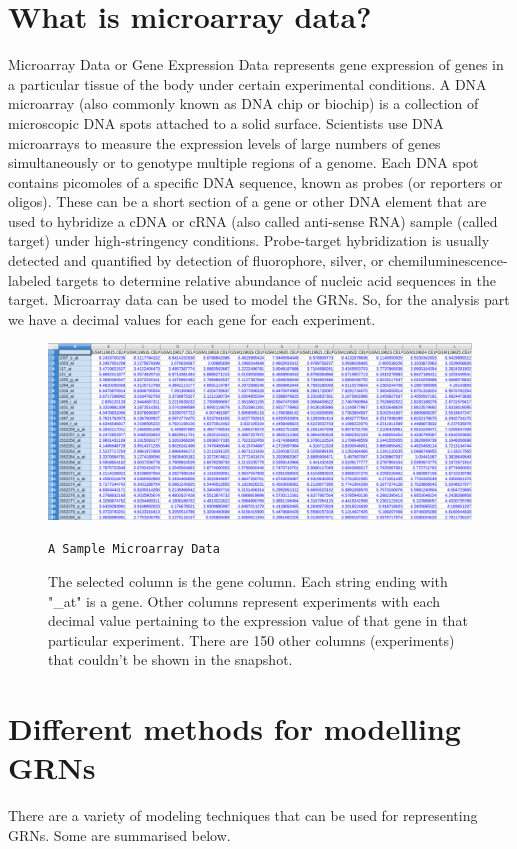 \documentclass[oneside, a4paper, 11pt]{book}
\begin{document}
\section{What is microarray data?}
Microarray Data or Gene Expression Data represents gene expression of genes in a particular tissue of the body under certain experimental conditions. A DNA microarray (also commonly known as DNA chip or biochip) is a collection of microscopic DNA spots attached to a solid surface. Scientists use DNA microarrays to measure the expression levels of large numbers of genes simultaneously or to genotype multiple regions of a genome. Each DNA spot contains picomoles of a specific DNA sequence, known as probes (or reporters or oligos). These can be a short section of a gene or other DNA element that are used to hybridize a cDNA or cRNA (also called anti-sense RNA) sample (called target) under high-stringency conditions. Probe-target hybridization is usually detected and quantified by detection of fluorophore, silver, or chemiluminescence-labeled targets to determine relative abundance of nucleic acid sequences in the target. Microarray data can be used to model the GRNs. So, for the analysis part we have a decimal values for each gene for each experiment.

\begin{figure}[h]
    \centering
    \includegraphics[width=\textwidth]{microarray.png}
    \caption {\texttt{A Sample Microarray Data}}
    \captionsetup{singlelinecheck=off,font=footnotesize, width=0.8\textwidth}
    \caption*{The selected column is the gene column. Each string ending with "\_at" is a gene. Other columns represent experiments with each decimal value pertaining to the expression value of that gene in that particular experiment. There are 150 other columns (experiments) that couldn't be shown in the snapshot.}
\end{figure}

\section{Different methods for modelling GRNs}
There are a variety of modeling techniques\cite{bolouri} that can be used for representing GRNs. Some are summarised below.
\end{document}
